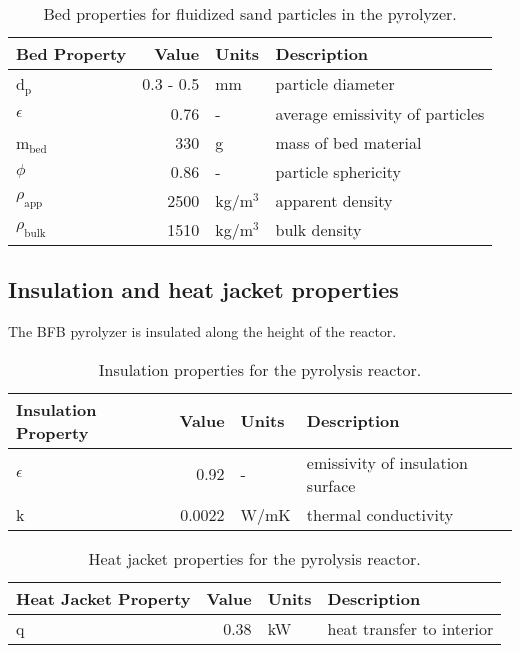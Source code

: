 \begin{table}[H]
    \centering
    \caption{Bed properties for fluidized sand particles in the pyrolyzer.}
    \label{tab:sand-properties}
    \begin{tabular}{lrll}
        \toprule
        Bed Property & Value & Units & Description \\
        \midrule
        d$_\textrm{p}$ & 0.3 - 0.5 & mm & particle diameter \\
        $\epsilon$ & 0.76 & - & average emissivity of particles \\
        m$_\textrm{bed}$ & 330 & g & mass of bed material \\
        $\phi$ & 0.86 & - & particle sphericity \\
        $\rho_\textrm{app}$ & 2500 & kg/m$^3$ & apparent density \\
        $\rho_\textrm{bulk}$ & 1510 & kg/m$^3$ & bulk density \\
        \bottomrule
    \end{tabular}
\end{table}

\subsection{Insulation and heat jacket properties}

The BFB pyrolyzer is insulated along the height of the reactor.

\begin{table}[H]
    \centering
    \caption{Insulation properties for the pyrolysis reactor.}
    \label{tab:insulation}
    \begin{tabular}{lrll}
        \toprule
        Insulation Property & Value & Units & Description \\
        \midrule
        $\epsilon$ & 0.92 & - & emissivity of insulation surface \\
        k & 0.0022 & W/mK & thermal conductivity \\
        \bottomrule
    \end{tabular}
\end{table}

\begin{table}[H]
    \centering
    \caption{Heat jacket properties for the pyrolysis reactor.}
    \label{tab:heatjacket}
    \begin{tabular}{lrll}
        \toprule
        Heat Jacket Property & Value & Units & Description \\
        \midrule
        q & 0.38 & kW & heat transfer to interior \\
        \bottomrule
    \end{tabular}
\end{table}


